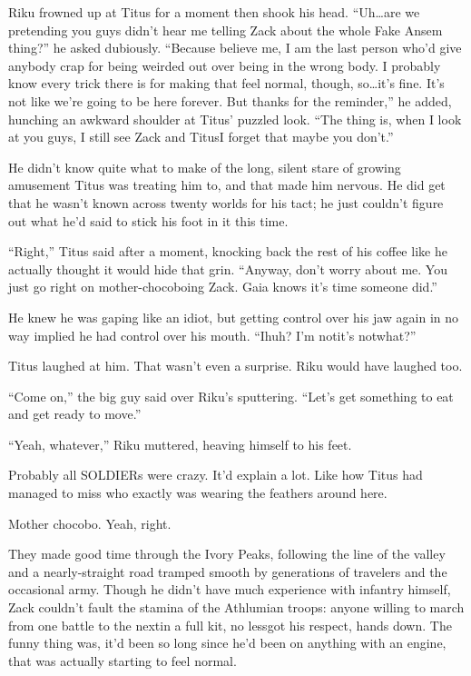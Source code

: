 Riku frowned up at Titus for a moment then shook his head. ``Uh\ldots are we pretending you guys didn't hear me telling Zack about the whole Fake Ansem thing?'' he asked dubiously. ``Because believe me, I am the last person who'd give anybody crap for being weirded out over being in the wrong body. I probably know every trick there is for making that feel normal, though, so\ldots it's fine. It's not like we're going to be here forever. But thanks for the reminder,'' he added, hunching an awkward shoulder at Titus' puzzled look. ``The thing is, when I look at you guys, I still see Zack and Titus\textemdash I forget that maybe you don't.''

He didn't know quite what to make of the long, silent stare of growing amusement Titus was treating him to, and that made him nervous. He did get that he wasn't known across twenty worlds for his tact; he just couldn't figure out what he'd said to stick his foot in it this time.

``Right,'' Titus said after a moment, knocking back the rest of his coffee like he actually thought it would hide that grin. ``Anyway, don't worry about me. You just go right on mother-chocoboing Zack. Gaia knows it's time someone did.''

He knew he was gaping like an idiot, but getting control over his jaw again in no way implied he had control over his mouth. ``I\textemdash huh? I'm not\textemdash it's not\textemdash what?''

Titus laughed at him. That wasn't even a surprise. Riku would have laughed too.

``Come on,'' the big guy said over Riku's sputtering. ``Let's get something to eat and get ready to move.''

``Yeah, whatever,'' Riku muttered, heaving himself to his feet.

Probably all SOLDIERs were crazy. It'd explain a lot. Like how Titus had managed to miss who exactly was wearing the feathers around here.

Mother chocobo. Yeah, right.


\scenechange


They made good time through the Ivory Peaks, following the line of the valley and a nearly-straight road tramped smooth by generations of travelers and the occasional army. Though he didn't have much experience with infantry himself, Zack couldn't fault the stamina of the Athlumian troops: anyone willing to march from one battle to the next\textemdash in a full kit, no less\textemdash got his respect, hands down. The funny thing was, it'd been so long since he'd been on anything with an engine, that was actually starting to feel normal.

